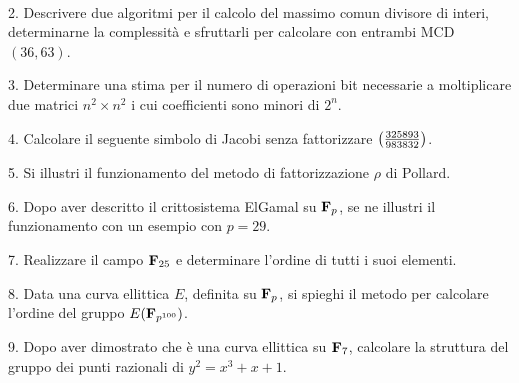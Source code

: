 \ \dotfill\ \bigskip\bigskip\bigskip\vfil\eject

\item{2.} Descrivere due algoritmi per il calcolo del massimo comun divisore di interi, determinarne la complessit\`a e sfruttarli
per calcolare con entrambi MCD$(36,63)$.\vv

\item{3.} Determinare una stima per il numero di operazioni bit necessarie a moltiplicare due matrici $n^2\times n^2$ 
i cui coefficienti sono minori di $2^n$.\vv

\item{4.} Calcolare il seguente simbolo di Jacobi senza fattorizzare
$\left({325893\over983832}\right)$.\ve\ \vs

\item{5.} Si illustri il funzionamento del metodo di fattorizzazione $\rho$ di  Pollard.\vv

\item{6.} Dopo aver descritto il crittosistema ElGamal su ${\bf F}_p$, se ne illustri il funzionamento con un esempio con $p = 29$.\vv

\item{7.} Realizzare il campo ${\bf F}_{25}$ e determinare l'ordine di tutti i suoi elementi.\ve\ \vs

\item{8.} Data una curva ellittica $E$, definita su ${\bf F}_p$, si spieghi il metodo per calcolare l'ordine
del gruppo $E({\bf F}_{p^{100}})$.\vv

\item{9.} Dopo aver dimostrato che \`e una curva ellittica su ${\bf F}_7$, 
calcolare la struttura del gruppo dei punti razionali di $y^2 = x^3 + x + 1$.\ \vst\bye
